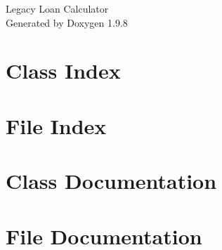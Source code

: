 \documentclass[twoside]{book}
\newcommand{\+}{\discretionary{\mbox{\scriptsize$\hookleftarrow$}}{}{}}
\newcommand{\clearemptydoublepage}{%
    \newpage{\pagestyle{empty}\cleardoublepage}%
  }
\begin{document}
  \raggedbottom
    \hypersetup{pageanchor=false,
                bookmarksnumbered=true,
                pdfencoding=unicode
               }
  \begin{titlepage}
  \vspace*{7cm}
  \begin{center}%
  {\Large Legacy Loan Calculator}\\
  \vspace*{1cm}
  {\large Generated by Doxygen 1.9.8}\\
  \end{center}
  \end{titlepage}
  \clearemptydoublepage
  \tableofcontents
  \clearemptydoublepage
  \hypersetup{pageanchor=true}
\chapter{Class Index}

\chapter{File Index}

\chapter{Class Documentation}

\chapter{File Documentation}

  \backmatter
  \newpage
  \clearemptydoublepage
  \printindex
\end{document}
